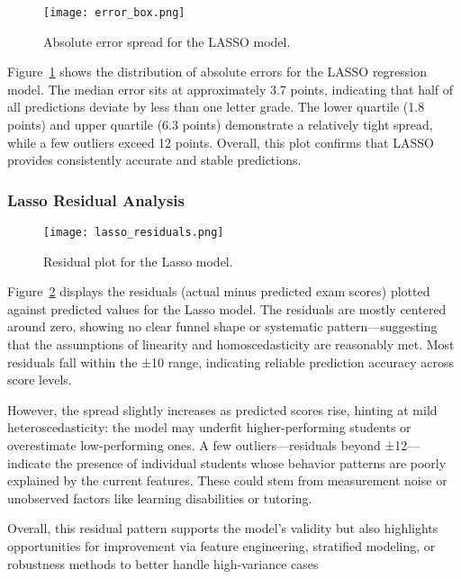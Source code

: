 \documentclass[conference]{IEEEtran}
\begin{document}
\begin{figure}[htbp]
  \centering
  \texttt{[image: error\_box.png]}
  \caption{Absolute error spread for the LASSO model.}
  \label{fig:error_box}
\end{figure}
Figure~\ref{fig:error_box} shows the distribution of absolute errors for the LASSO regression model. The median error sits at approximately 3.7 points, indicating that half of all predictions deviate by less than one letter grade. The lower quartile (1.8 points) and upper quartile (6.3 points) demonstrate a relatively tight spread, while a few outliers exceed 12 points. Overall, this plot confirms that LASSO provides consistently accurate and stable predictions.

\subsubsection*{Lasso Residual Analysis}

\begin{figure}[htbp]
  \centering
  \texttt{[image: lasso\_residuals.png]}
  \caption{Residual plot for the Lasso model.}
  \label{fig:lasso_residuals}
\end{figure}

Figure~\ref{fig:lasso_residuals} displays the residuals (actual minus predicted exam scores) plotted against predicted values for the Lasso model. The residuals are mostly centered around zero, showing no clear funnel shape or systematic pattern—suggesting that the assumptions of linearity and homoscedasticity are reasonably met. Most residuals fall within the ±10 range, indicating reliable prediction accuracy across score levels.

However, the spread slightly increases as predicted scores rise, hinting at mild heteroscedasticity: the model may underfit higher-performing students or overestimate low-performing ones. A few outliers—residuals beyond ±12—indicate the presence of individual students whose behavior patterns are poorly explained by the current features. These could stem from measurement noise or unobserved factors like learning disabilities or tutoring.

Overall, this residual pattern supports the model’s validity but also highlights opportunities for improvement via feature engineering, stratified modeling, or robustness methods to better handle high-variance cases
\end{document}

